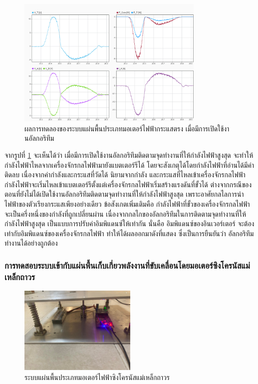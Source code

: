\documentclass[11pt,a4paper]{article}
\begin{document}
\begin{figure}[H]
    \centering
    \includegraphics[width=0.8\textwidth]{dc-results/dc-with-inv.png}
    \caption{ผลการทดลองของระบบแผ่นพื้นประเภทมอเตอร์ไฟฟ้ากระแสตรง เมื่อมีการเปิดใช้งานอัลกอริทึม}
    \label{dc-with-inv}
\end{figure}

จากรูปที่ \ref{dc-with-inv} จะเห็นได้ว่า เมื่อมีการเปิดใช้งานอัลกอริทึมติดตามจุดทำงานที่ให้กำลังไฟฟ้าสูงสุด จะทำให้กำลังไฟฟ้าไหลจากเครื่องจักรกลไฟฟ้ามายังแบตเตอร์รีได้ โดยจะสังเกตุได้โดยกำลังไฟฟ้าที่อ่านได้มีค่าติดลบ เนื่องจากค่ากำลังและกระแสที่วัดได้ นิยามจากกำลัง และกระแสที่ไหลเข้าเครื่องจักรกลไฟฟ้า กำลังไฟฟ้าจะเริ่มไหลเข้าแบตเตอร์รีตั้งแต่เครื่องจักรกลไฟฟ้าเริ่มสร้างแรงดันที่ขั้วได้ ต่างจากกรณีของตอนที่ยังไม่ได้เปิดใช้งานอัลกอริทึมติดตามจุดทำงานที่ให้กำลังไฟฟ้าสูงสุด เพราะอาศัยกลไลการนำไฟฟ้าของตัวเรียงกระแสเพียงอย่างเดียว ข้อสังเกตเพิ่มเติมคือ กำลังไฟฟ้าที่ขั้วของเครื่องจักรกลไฟฟ้า จะเป็นครึ่งหนึ่งของกำลังที่ถูกเปลี่ยนผ่าน เนื่องจากกลไกของอัลกอริทึมในการติดตามจุดทำงานที่ให้กำลังไฟฟ้าสูงสุด เป็นแบบการปรับค่าอิมพิแดนซ์ให้เท่ากัน นั่นคือ อิมพิแดนซ์ของอินเวอร์เตอร์ จะต้องเท่ากับอิมพิแดนซ์ของเครื่องจักรกลไฟฟ้า ทำให้ได้ผลออกมาดังที่แสดง ซึ่งเป็นการยืนยันว่า อัลกอริทึมทำงานได้อย่างถูกต้อง

\subsubsection{การทดสอบระบบเข้ากับแผ่นพื้นเก็บเกี่ยวพลังงานที่ขับเคลื่อนโดยมอเตอร์ซิงโครนัสแม่เหล็กถาวร}

\begin{figure}[H]
    \centering
    \includegraphics[width=0.5\textwidth]{dc-results/ac-exp.jpg}
    \caption{ระบบแผ่นพื้นประเภทมอเตอร์ไฟฟ้าซิงโครนัสแม่เหล็กถาวร}
\end{figure}
\end{document}
